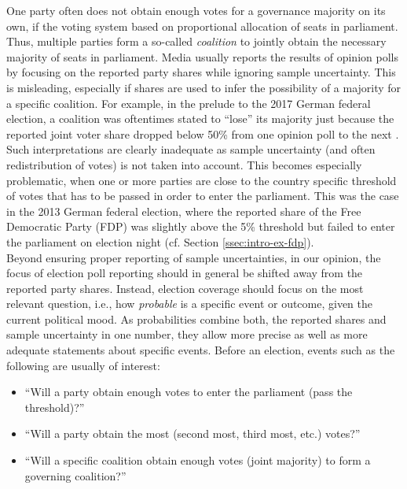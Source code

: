 \documentclass[smallextended]{svjour3}      %
\begin{document}
One party often does not obtain enough votes for a governance majority on its own,
if the voting system based on proportional allocation of seats in
parliament. Thus, multiple parties form
a so-called \emph{coalition} to jointly obtain the necessary majority of seats
in parliament. Media usually reports the results of opinion polls by focusing
on the reported party shares while ignoring sample uncertainty. This is misleading,
especially if shares are used to infer the possibility of a majority for
a specific coalition. For example, in the prelude to the 2017 German federal election,
a coalition was oftentimes stated to ``lose'' its majority just because the reported joint
voter share dropped below 50\% from one opinion poll to the next \citep[e.g.,][]{umfrage_2017}.
Such interpretations are clearly inadequate as sample uncertainty
(and often redistribution of votes) is not taken into account. This becomes especially
problematic, when one or more parties are close to the country specific threshold
of votes that has to be passed in order to enter the parliament. This was the case
in the 2013 German federal election, where the reported share of the Free Democratic
Party (FDP) was slightly above the 5\% threshold but failed to enter the
parliament on election night (cf. Section \ref{ssec:intro-ex-fdp}).\\


Beyond ensuring proper reporting of sample uncertainties, in our opinion, the
focus of election poll reporting should in general be shifted away from the
reported party shares. Instead, election coverage should focus on the most relevant
question, i.e., how {\it probable} is a specific event or outcome, given
the current political mood. As probabilities combine both, the reported shares and
sample uncertainty in one number, they allow more precise as well as more adequate
statements about specific events. Before an election, events such as the
following are usually of interest:

\begin{itemize}
  \item ``Will a party obtain enough votes to enter the parliament (pass the threshold)?''
  \item ``Will a party obtain the most (second most, third most, etc.) votes?''
  \item ``Will a specific coalition obtain enough votes (joint majority) to form a governing coalition?''
\end{itemize}
\end{document}
